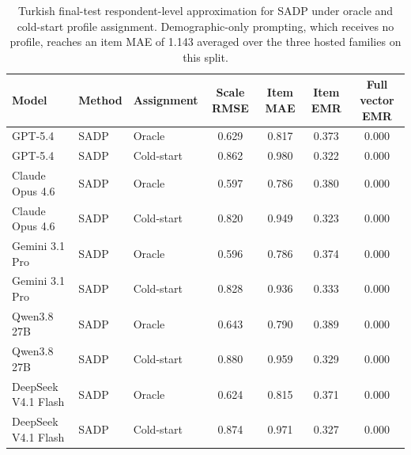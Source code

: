 \begin{table}[pos=!htbp]
\small\centering\setlength{\tabcolsep}{2.5pt}
\caption{Turkish final-test respondent-level approximation for SADP under oracle and cold-start profile assignment. Demographic-only prompting, which receives no profile, reaches an item MAE of 1.143 averaged over the three hosted families on this split.}
\label{tab:respondent-level}
\begin{tabular*}{\textwidth}{@{\extracolsep{\fill}}lllcccc@{}}
\toprule
Model & Method & Assignment & Scale RMSE & Item MAE & Item EMR & Full vector EMR \\
\midrule
GPT-5.4 & SADP & Oracle & 0.629 & 0.817 & 0.373 & 0.000 \\
GPT-5.4 & SADP & Cold-start & 0.862 & 0.980 & 0.322 & 0.000 \\
Claude Opus 4.6 & SADP & Oracle & 0.597 & 0.786 & 0.380 & 0.000 \\
Claude Opus 4.6 & SADP & Cold-start & 0.820 & 0.949 & 0.323 & 0.000 \\
Gemini 3.1 Pro & SADP & Oracle & 0.596 & 0.786 & 0.374 & 0.000 \\
Gemini 3.1 Pro & SADP & Cold-start & 0.828 & 0.936 & 0.333 & 0.000 \\
Qwen3.8 27B & SADP & Oracle & 0.643 & 0.790 & 0.389 & 0.000 \\
Qwen3.8 27B & SADP & Cold-start & 0.880 & 0.959 & 0.329 & 0.000 \\
DeepSeek V4.1 Flash & SADP & Oracle & 0.624 & 0.815 & 0.371 & 0.000 \\
DeepSeek V4.1 Flash & SADP & Cold-start & 0.874 & 0.971 & 0.327 & 0.000 \\
\bottomrule
\end{tabular*}
\end{table}
